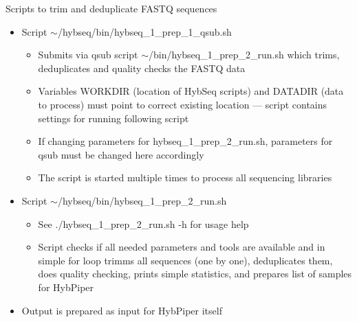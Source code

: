 \documentclass[compress,  xelatex, 11pt, xcolor=x11names, aspectratio=169,
	hyperref={
		bookmarks=true,
		unicode=true,
		colorlinks=true,
		pdftitle={HybSeq course},
		plainpages=false,
		pdfauthor={Vojtech Zeisek},
		pdfsubject={Practical processing of HybSeq target enrichment sequencing data on computing grids like MetaCentrum},
		pdfcreator={XeLaTeX},
		pdfkeywords={BASH, command line, GNU, HybSeq, Linux, MetaCentrum, sequencing shell, target enrichment},
		linkcolor=Turquoise4, %
		anchorcolor=DodgerBlue4, %
		citecolor=DodgerBlue4, %
		filecolor=DodgerBlue4, %
		menucolor=Tan4, %
		urlcolor=DarkOliveGreen4 %
		},
	url={hyphens, lowtilde} %
	]{beamer}
\renewcommand{\texttt}[1]{\colorbox{Cornsilk2}{{\ttfamily #1}}}
\begin{document}
\begin{frame}{Scripts to trim and deduplicate FASTQ sequences}
	\begin{itemize}
		\item Script \texttt{$\sim$/hybseq/bin/hybseq\_1\_prep\_1\_qsub.sh}
		\begin{itemize}
			\item Submits via \texttt{qsub} script \texttt{$\sim$/bin/hybseq\_1\_prep\_2\_run.sh} which trims, deduplicates and quality checks the FASTQ data
			\item Variables \texttt{WORKDIR} (location of HybSeq scripts) and \texttt{DATADIR} (data to process) must point to correct existing location --- script contains settings for running following script
			\item If changing parameters for \texttt{hybseq\_1\_prep\_2\_run.sh}, parameters for \texttt{qsub} must be changed here accordingly
			\item The script is started multiple times to process all sequencing libraries
		\end{itemize}
		\item Script \texttt{$\sim$/hybseq/bin/hybseq\_1\_prep\_2\_run.sh}
		\begin{itemize}
			\item See \texttt{./hybseq\_1\_prep\_2\_run.sh -h} for usage help
			\item Script checks if all needed parameters and tools are available and in simple \texttt{for} loop trimms all sequences (one by one), deduplicates them, does quality checking, prints simple statistics, and prepares list of samples for HybPiper
		\end{itemize}
		\item Output is prepared as input for HybPiper itself
	\end{itemize}
\end{frame}
\end{document}
